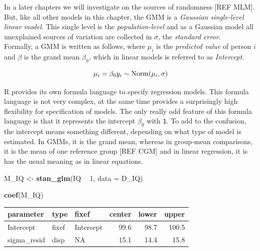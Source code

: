 \documentclass[]{svmono}
\newenvironment{Shaded}{\begin{snugshade}}{\end{snugshade}}
\newcommand{\KeywordTok}[1]{\textcolor[rgb]{0.13,0.29,0.53}{\textbf{#1}}}
\newcommand{\DataTypeTok}[1]{\textcolor[rgb]{0.13,0.29,0.53}{#1}}
\newcommand{\DecValTok}[1]{\textcolor[rgb]{0.00,0.00,0.81}{#1}}
\newcommand{\StringTok}[1]{\textcolor[rgb]{0.31,0.60,0.02}{#1}}
\newcommand{\OperatorTok}[1]{\textcolor[rgb]{0.81,0.36,0.00}{\textbf{#1}}}
\newcommand{\NormalTok}[1]{#1}
\begin{document}
In a later chapters we will investigate on the sources of randomness
{[}REF MLM{]}. But, like all other models in this chapter, the GMM is a
\emph{Gaussian single-level linear model}. This single level is the
\emph{population-level} and as a Gaussian model all unexplained sources
of variation are collected in \(\sigma\), the \emph{standard error}.\\
Formally, a GMM is written as follows, where \(\mu_i\) is the
\emph{predicted value} of person \(i\) and \(\beta\) is the grand mean
\(\beta_0\), which in linear models is referred to as \emph{Intercept}.

\[
\mu_i = \beta_0\\
y_i \sim \textrm{Norm}(\mu_i, \sigma)
\]

R provides its own formula language to specify regression models. This
formula language is not very complex, at the same time provides a
surprisingly high flexibility for specification of models. The only
really odd feature of this formula language is that it represents the
intercept \(\beta_0\) with \texttt{1}. To add to the confusion, the
intercept means something different, depending on what type of model is
estimated. In GMMs, it is the grand mean, whereas in group-mean
comparisons, it is the mean of one reference group {[}REF CGM{]} and in
linear regression, it is has the usual meaning as in linear equations.

\begin{Shaded}
\begin{Highlighting}[]
\NormalTok{M_IQ <-}\StringTok{ }\KeywordTok{stan_glm}\NormalTok{(IQ }\OperatorTok{~}\StringTok{ }\DecValTok{1}\NormalTok{,}
                 \DataTypeTok{data =}\NormalTok{ D_IQ)}
\end{Highlighting}
\end{Shaded}

\begin{Shaded}
\begin{Highlighting}[]
\KeywordTok{coef}\NormalTok{(M_IQ)}
\end{Highlighting}
\end{Shaded}

\begin{longtable}[]{@{}lllrrr@{}}
\toprule
parameter & type & fixef & center & lower & upper\tabularnewline
\midrule
\endhead
Intercept & fixef & Intercept & 99.6 & 98.7 & 100.5\tabularnewline
sigma\_resid & disp & NA & 15.1 & 14.4 & 15.8\tabularnewline
\bottomrule
\end{longtable}
\end{document}
